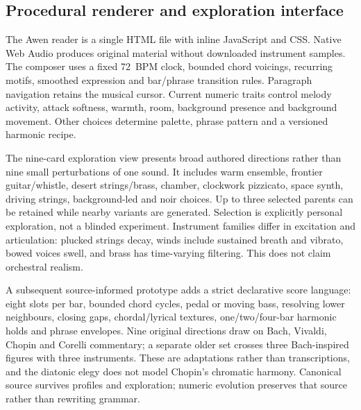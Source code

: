 \documentclass[11pt]{article}
\begin{document}
\subsection{Procedural renderer and exploration interface}
The Awen reader is a single HTML file with inline JavaScript and CSS. Native Web Audio produces original material without downloaded instrument samples. The composer uses a fixed 72~BPM clock, bounded chord voicings, recurring motifs, smoothed expression and bar/phrase transition rules. Paragraph navigation retains the musical cursor. Current numeric traits control melody activity, attack softness, warmth, room, background presence and background movement. Other choices determine palette, phrase pattern and a versioned harmonic recipe.

The nine-card exploration view presents broad authored directions rather than nine small perturbations of one sound. It includes warm ensemble, frontier guitar/whistle, desert strings/brass, chamber, clockwork pizzicato, space synth, driving strings, background-led and noir choices. Up to three selected parents can be retained while nearby variants are generated. Selection is explicitly personal exploration, not a blinded experiment. Instrument families differ in excitation and articulation: plucked strings decay, winds include sustained breath and vibrato, bowed voices swell, and brass has time-varying filtering. This does not claim orchestral realism.

A subsequent source-informed prototype adds a strict declarative score language: eight slots per bar, bounded chord cycles, pedal or moving bass, resolving lower neighbours, closing gaps, chordal/lyrical textures, one/two/four-bar harmonic holds and phrase envelopes. Nine original directions draw on Bach, Vivaldi, Chopin and Corelli commentary; a separate older set crosses three Bach-inspired figures with three instruments. These are adaptations rather than transcriptions, and the diatonic elegy does not model Chopin's chromatic harmony. Canonical source survives profiles and exploration; numeric evolution preserves that source rather than rewriting grammar.
\end{document}
